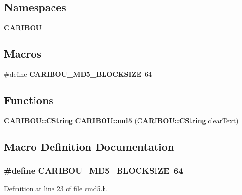 \subsection*{Namespaces}
\begin{DoxyCompactItemize}
\item 
 {\bf C\+A\+R\+I\+B\+OU}
\end{DoxyCompactItemize}
\subsection*{Macros}
\begin{DoxyCompactItemize}
\item 
\#define {\bf C\+A\+R\+I\+B\+O\+U\+\_\+\+M\+D5\+\_\+\+B\+L\+O\+C\+K\+S\+I\+ZE}~64
\end{DoxyCompactItemize}
\subsection*{Functions}
\begin{DoxyCompactItemize}
\item 
{\bf C\+A\+R\+I\+B\+O\+U\+::\+C\+String} {\bf C\+A\+R\+I\+B\+O\+U\+::md5} ({\bf C\+A\+R\+I\+B\+O\+U\+::\+C\+String} clear\+Text)
\end{DoxyCompactItemize}


\subsection{Macro Definition Documentation}
\subsubsection[{C\+A\+R\+I\+B\+O\+U\+\_\+\+M\+D5\+\_\+\+B\+L\+O\+C\+K\+S\+I\+ZE}]{\setlength{\rightskip}{0pt plus 5cm}\#define C\+A\+R\+I\+B\+O\+U\+\_\+\+M\+D5\+\_\+\+B\+L\+O\+C\+K\+S\+I\+ZE~64}\label{cmd5_8h_a81ebbc0b0b7b4db40eadc63bc51ddfc1}


Definition at line 23 of file cmd5.\+h.

